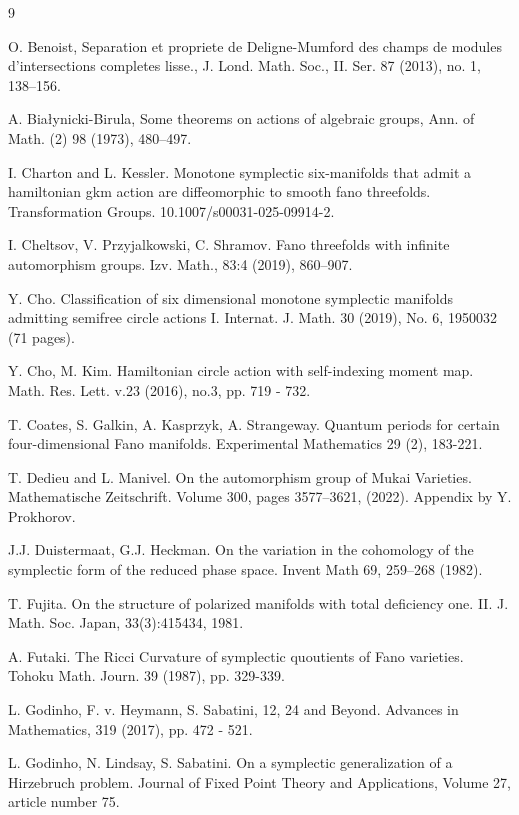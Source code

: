 \documentclass[12pt]{article}
\begin{document}
\begin{thebibliography}{9}

 O. Benoist, Separation et propriete de Deligne-Mumford des champs de modules
d’intersections completes lisse., J. Lond. Math. Soc., II. Ser. 87 (2013), no. 1,
138–156.

 A. Białynicki-Birula, Some theorems on actions of algebraic groups, Ann. of Math. (2) 98 (1973), 480–497. 

 I. Charton and L. Kessler. Monotone symplectic six-manifolds that admit a hamiltonian gkm action
are diffeomorphic to smooth fano threefolds. Transformation Groups. 10.1007/s00031-025-09914-2.

 I. Cheltsov, V. Przyjalkowski, C. Shramov. Fano threefolds with infinite automorphism groups. 	Izv. Math., 83:4 (2019), 860--907.


 Y. Cho. Classification of six dimensional monotone symplectic manifolds admitting semifree circle actions I. Internat. J. Math. 30 (2019), No. 6, 1950032 (71 pages). 


 Y. Cho, M. Kim. Hamiltonian circle action with self-indexing moment map.  Math. Res. Lett. v.23 (2016), no.3, pp. 719 - 732.


 T. Coates, S. Galkin, A. Kasprzyk, A. Strangeway.  Quantum periods for certain four-dimensional Fano manifolds. Experimental Mathematics 29 (2), 183-221.


  T. Dedieu and  L. Manivel. On the automorphism group of Mukai Varieties. Mathematische Zeitschrift. Volume 300, pages 3577–3621, (2022).  Appendix by Y. Prokhorov.



 J.J. Duistermaat,  G.J. Heckman. On the variation in the cohomology of the symplectic form of the reduced phase space. Invent Math 69, 259–268 (1982).

  T. Fujita. On the structure of polarized manifolds with total deficiency one. II. J. Math. Soc.
 Japan, 33(3):415434, 1981.



 A. Futaki. The Ricci Curvature of symplectic quoutients of Fano varieties. Tohoku Math. Journ. 
39 (1987), pp. 329-339.


 L. Godinho, F. v. Heymann,  S. Sabatini,  12, 24 and Beyond. Advances in Mathematics, 319 (2017),  pp. 472 - 521.

 L. Godinho, N. Lindsay,  S. Sabatini.   
On a symplectic generalization of a Hirzebruch problem.   Journal of Fixed Point Theory and Applications, Volume 27, article number 75.


\end{thebibliography}
\end{document}
